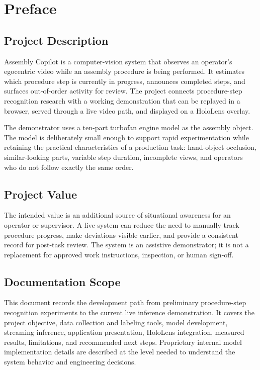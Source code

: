 \chapter{Preface}

\section{Project Description}

Assembly Copilot is a computer-vision system that observes an operator's
egocentric video while an assembly procedure is being performed. It estimates
which procedure step is currently in progress, announces completed steps, and
surfaces out-of-order activity for review. The project connects procedure-step
recognition research with a working demonstration that can be replayed in a
browser, served through a live video path, and displayed on a HoloLens overlay.

The demonstrator uses a ten-part turbofan engine model as the assembly object.
The model is deliberately small enough to support rapid experimentation while
retaining the practical characteristics of a production task: hand-object
occlusion, similar-looking parts, variable step duration, incomplete views, and
operators who do not follow exactly the same order.

\section{Project Value}

The intended value is an additional source of situational awareness for an
operator or supervisor. A live system can reduce the need to manually track
procedure progress, make deviations visible earlier, and provide a consistent
record for post-task review. The system is an assistive demonstrator; it is not
a replacement for approved work instructions, inspection, or human sign-off.

\section{Documentation Scope}

This document records the development path from preliminary procedure-step
recognition experiments to the current live inference demonstration. It covers
the project objective, data collection and labeling tools, model development,
streaming inference, application presentation, HoloLens integration, measured
results, limitations, and recommended next steps. Proprietary internal model
implementation details are described at the level needed to understand the
system behavior and engineering decisions.

